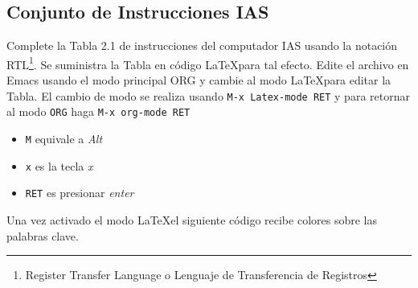 \documentclass{article}
\begin{document}
\subsection{Conjunto de Instrucciones IAS}
\label{sec:org4ea543a}
Complete la Tabla 2.1 de instrucciones del computador IAS
\autocite[p.47]{stallings2006} usando la notación RTL\footnote{Register Transfer Language o Lenguaje de Transferencia de Registros}. Se suministra
la Tabla en código \LaTeX para tal efecto. Edite el archivo en Emacs
usando el modo principal ORG y cambie al modo \LaTeX para editar la
Tabla. El cambio de modo se realiza usando \texttt{M-x Latex-mode RET} y para
retornar al modo \texttt{ORG} haga \texttt{M-x org-mode RET}

\begin{itemize}
\item \texttt{M} equivale a \emph{Alt}
\item \texttt{x} es la tecla \emph{x}
\item \texttt{RET} es presionar \emph{enter}
\end{itemize}

Una vez activado el modo \LaTeX el siguiente código recibe colores
sobre las palabras clave.
\end{document}
